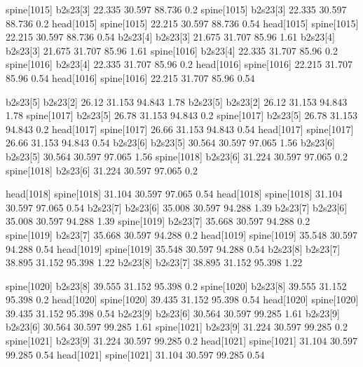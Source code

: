 spine[1015]    b2s23[3]    22.335    30.597    88.736    0.2
spine[1015]    b2s23[3]    22.335    30.597    88.736    0.2
head[1015]    spine[1015]    22.215    30.597    88.736    0.54
head[1015]    spine[1015]    22.215    30.597    88.736    0.54
b2s23[4]    b2s23[3]    21.675    31.707    85.96    1.61
b2s23[4]    b2s23[3]    21.675    31.707    85.96    1.61
spine[1016]    b2s23[4]    22.335    31.707    85.96    0.2
spine[1016]    b2s23[4]    22.335    31.707    85.96    0.2
head[1016]    spine[1016]    22.215    31.707    85.96    0.54
head[1016]    spine[1016]    22.215    31.707    85.96    0.54


b2s23[5]    b2s23[2]    26.12    31.153    94.843    1.78
b2s23[5]    b2s23[2]    26.12    31.153    94.843    1.78
spine[1017]    b2s23[5]    26.78    31.153    94.843    0.2
spine[1017]    b2s23[5]    26.78    31.153    94.843    0.2
head[1017]    spine[1017]    26.66    31.153    94.843    0.54
head[1017]    spine[1017]    26.66    31.153    94.843    0.54
b2s23[6]    b2s23[5]    30.564    30.597    97.065    1.56
b2s23[6]    b2s23[5]    30.564    30.597    97.065    1.56
spine[1018]    b2s23[6]    31.224    30.597    97.065    0.2
spine[1018]    b2s23[6]    31.224    30.597    97.065    0.2


head[1018]    spine[1018]    31.104    30.597    97.065    0.54
head[1018]    spine[1018]    31.104    30.597    97.065    0.54
b2s23[7]    b2s23[6]    35.008    30.597    94.288    1.39
b2s23[7]    b2s23[6]    35.008    30.597    94.288    1.39
spine[1019]    b2s23[7]    35.668    30.597    94.288    0.2
spine[1019]    b2s23[7]    35.668    30.597    94.288    0.2
head[1019]    spine[1019]    35.548    30.597    94.288    0.54
head[1019]    spine[1019]    35.548    30.597    94.288    0.54
b2s23[8]    b2s23[7]    38.895    31.152    95.398    1.22
b2s23[8]    b2s23[7]    38.895    31.152    95.398    1.22


spine[1020]    b2s23[8]    39.555    31.152    95.398    0.2
spine[1020]    b2s23[8]    39.555    31.152    95.398    0.2
head[1020]    spine[1020]    39.435    31.152    95.398    0.54
head[1020]    spine[1020]    39.435    31.152    95.398    0.54
b2s23[9]    b2s23[6]    30.564    30.597    99.285    1.61
b2s23[9]    b2s23[6]    30.564    30.597    99.285    1.61
spine[1021]    b2s23[9]    31.224    30.597    99.285    0.2
spine[1021]    b2s23[9]    31.224    30.597    99.285    0.2
head[1021]    spine[1021]    31.104    30.597    99.285    0.54
head[1021]    spine[1021]    31.104    30.597    99.285    0.54


